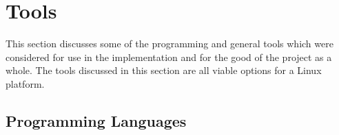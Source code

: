 

\section{Tools}
\label{sec:restools}

This section discusses some of the programming and general tools which were considered
for use in the implementation and for the good of the project as a whole.
The tools discussed in this section are all viable options for a Linux platform.

\subsection*{Programming Languages}


